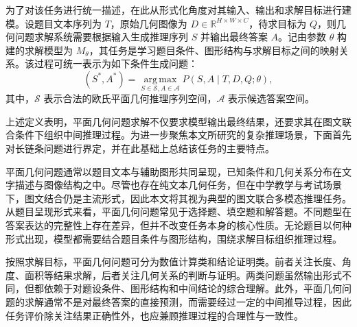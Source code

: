 为了对该任务进行统一描述，在此从形式化角度对其输入、输出和求解目标进行建模。设题目文本序列为 $T$，原始几何图像为 $D \in \mathbb{R}^{H \times W \times C}$，待求目标为 $Q$，则几何问题求解系统需要根据输入生成推理序列 $S$ 并输出最终答案 $A$。记由参数 $\theta$ 构建的求解模型为 $M_{\theta}$，其任务是学习题目条件、图形结构与求解目标之间的映射关系。该过程可统一表示为如下条件生成问题：
\begin{equation}
    (S^*, A^*) = \operatorname*{arg\,max}_{S \in \mathcal{S}, A \in \mathcal{A}} P(S, A \mid T, D, Q; \theta),
\end{equation}
其中，$\mathcal{S}$ 表示合法的欧氏平面几何推理序列空间，$\mathcal{A}$ 表示候选答案空间。

上述定义表明，平面几何问题求解不仅要求模型输出最终结果，还要求其在图文联合条件下组织中间推理过程。为进一步聚焦本文所研究的复杂推理场景，下面首先对长链条问题进行界定，并在此基础上总结该任务的主要特点。





平面几何问题通常以题目文本与辅助图形共同呈现，已知条件和几何关系分布在文字描述与图像结构之中。尽管也存在纯文本几何任务，但在中学教学与考试场景下，图文结合仍是主流形式，因此本文将其视为典型的图文联合多模态推理任务。从题目呈现形式来看，平面几何问题常见于选择题、填空题和解答题。不同题型在答案表达的完整性上存在差异，但并不改变任务本身的核心性质。无论题目以何种形式出现，模型都需要结合题目条件与图形结构，围绕求解目标组织推理过程。

按照求解目标，平面几何问题可分为数值计算类和结论证明类。前者关注长度、角度、面积等结果求解，后者关注几何关系的判断与证明。两类问题虽然输出形式不同，但都依赖于对题设条件、图形结构和中间结论的综合理解。此外，平面几何问题的求解通常不是对最终答案的直接预测，而需要经过一定的中间推导过程，因此任务评价除关注结果正确性外，也应兼顾推理过程的合理性与一致性。


